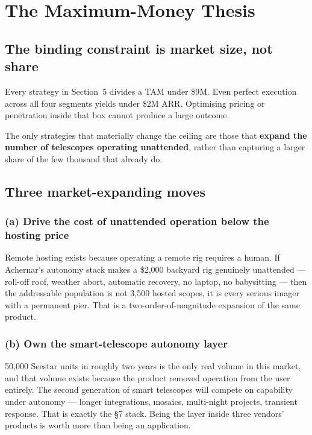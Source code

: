 \documentclass[11pt]{article}
\newcommand{\dollar}[1]{\$#1}
\begin{document}
\section{The Maximum-Money Thesis}

\subsection{The binding constraint is market size, not share}

Every strategy in Section~5 divides a TAM under \dollar{9}M. Even perfect
execution across all four segments yields under \dollar{2}M ARR. Optimising
pricing or penetration inside that box cannot produce a large outcome.

\begin{keybox}
The only strategies that materially change the ceiling are those that
\textbf{expand the number of telescopes operating unattended}, rather than
capturing a larger share of the few thousand that already do.
\end{keybox}

\subsection{Three market-expanding moves}

\subsubsection*{(a) Drive the cost of unattended operation below the hosting price}

Remote hosting exists because operating a remote rig requires a human. If
Achernar's autonomy stack makes a \dollar{2{,}000} backyard rig genuinely
unattended --- roll-off roof, weather abort, automatic recovery, no laptop, no
babysitting --- then the addressable population is not 3,500 hosted scopes, it
is every serious imager with a permanent pier. That is a two-order-of-magnitude
expansion of the same product.

\subsubsection*{(b) Own the smart-telescope autonomy layer}

50,000 Seestar units in roughly two years is the only real volume in this
market, and that volume exists because the product removed operation from the
user entirely. The second generation of smart telescopes will compete on
capability under autonomy --- longer integrations, mosaics, multi-night
projects, transient response. That is exactly the §7 stack. Being the layer
inside three vendors' products is worth more than being an application.
\end{document}
